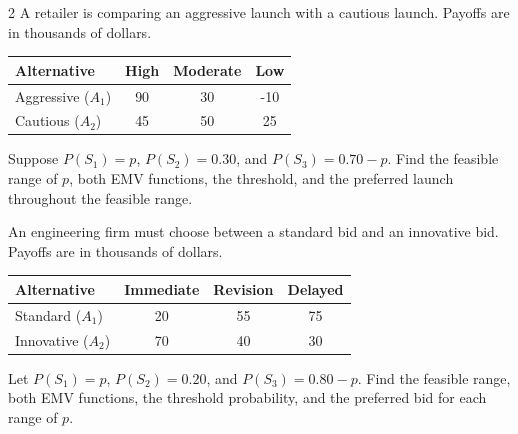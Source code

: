 \begin{multicols}{2}
		A retailer is comparing an aggressive launch with a cautious launch. Payoffs are in thousands of dollars.
		\begin{center}\scriptsize\setlength{\tabcolsep}{2pt}\renewcommand{\arraystretch}{1.15}
			\begin{tabular}{lccc}\toprule
			Alternative&High&Moderate&Low\\ \midrule
			Aggressive ($A_1$)&90&30&-10\\
			Cautious ($A_2$)&45&50&25\\ \bottomrule
			\end{tabular}
		\end{center}
		Suppose $P(S_1)=p$, $P(S_2)=0.30$, and $P(S_3)=0.70-p$. Find the feasible range of $p$, both EMV functions, the threshold, and the preferred launch throughout the feasible range.

		An engineering firm must choose between a standard bid and an innovative bid. Payoffs are in thousands of dollars.
		\begin{center}\scriptsize\setlength{\tabcolsep}{2pt}\renewcommand{\arraystretch}{1.15}
			\begin{tabular}{lccc}\toprule
			Alternative&Immediate&Revision&Delayed\\ \midrule
			Standard ($A_1$)&20&55&75\\
			Innovative ($A_2$)&70&40&30\\ \bottomrule
			\end{tabular}
		\end{center}
		Let $P(S_1)=p$, $P(S_2)=0.20$, and $P(S_3)=0.80-p$. Find the feasible range, both EMV functions, the threshold probability, and the preferred bid for each range of $p$.
	\end{multicols}


